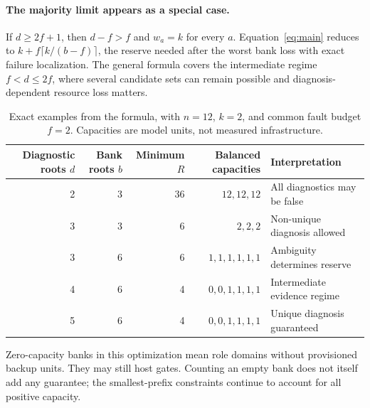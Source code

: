 \documentclass[11pt,a4paper]{article}
\theoremstyle{definition}\newtheorem{definition}{Definition}
\begin{document}
\paragraph{The majority limit appears as a special case.}
If $d\geq2f+1$, then $d-f>f$ and $w_a=k$ for every $a$. Equation~\eqref{eq:main} reduces to $k+f\lceil k/(b-f)\rceil$, the reserve needed after the worst bank loss with exact failure localization. The general formula covers the intermediate regime $f<d\leq2f$, where several candidate sets can remain possible and diagnosis-dependent resource loss matters.

\begin{table}[t]
\centering\small
\caption{Exact examples from the formula, with $n=12$, $k=2$, and common fault budget $f=2$. Capacities are model units, not measured infrastructure.}
\begin{tabular}{@{}rrrrl@{}}\toprule
Diagnostic roots $d$&Bank roots $b$&Minimum $R$&Balanced capacities&Interpretation\\\midrule
2&3&36&$12,12,12$&All diagnostics may be false\\
3&3&6&$2,2,2$&Non-unique diagnosis allowed\\
3&6&6&$1,1,1,1,1,1$&Ambiguity determines reserve\\
4&6&4&$0,0,1,1,1,1$&Intermediate evidence regime\\
5&6&4&$0,0,1,1,1,1$&Unique diagnosis guaranteed\\\bottomrule
\end{tabular}
\end{table}
Zero-capacity banks in this optimization mean role domains without provisioned backup units. They may still host gates. Counting an empty bank does not itself add any guarantee; the smallest-prefix constraints continue to account for all positive capacity.
\end{document}
